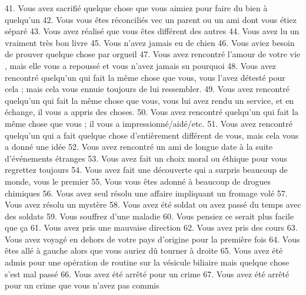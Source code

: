 \begin{tabular}
  41. Vous avez sacrifié quelque chose que vous aimiez pour faire du bien à quelqu'un
  42. Vous vous êtes réconciliés vec un parent ou un ami dont vous étiez séparé
  43. Vous avez réalisé que vous êtes différent des autres
  44. Vous avez lu un vraiment très bon livre
  45. Vous n'avez jamais eu de chien
  46. Vous aviez besoin de prouver quelque chose par orgueil
  47. Vous avez rencontré l'amour de votre vie , mais elle vous a repoussé et vous n'avez jamais su pourquoi
  48. Vous avez rencontré quelqu'un qui fait la même chose que vous, vous l'avez détesté pour cela ; mais cela vous ennuie toujours de lui ressembler.
  49. Vous avez rencontré quelqu'un qui fait la même chose que vous, vous lui avez rendu un service, et en échange, il vous a appris des choses.
  50. Vous avez rencontré quelqu'un qui fait la même chose que vous ; il vous a impressionné/aidé/etc.
  51. Vous avez rencontré quelqu'un qui a fait quelque chose d'entièrement différent de vous, mais cela vous a donné une idée
  52. Vous avez rencontré un ami de longue date à la suite d'événements étranges
  53. Vous avez fait un choix moral ou éthique pour vous regrettez toujours
  54. Vous avez fait une découverte qui a surpris beaucoup de monde, vous le premier
  55. Vous vous êtes adonné à beaucoup de drogues chimiques
  56. Vous avez seul résolu une affaire impliquant un fromage volé
  57. Vous avez résolu un mystère
  58. Vous avez été soldat ou avez passé du temps avec des soldats
  59. Vous souffrez d'une maladie
  60. Vous pensiez ce serait plus facile que ça
  61. Vous avez pris une mauvaise direction
  62. Vous avez pris des cours
  63. Vous avez voyagé en dehors de votre pays d'origine pour la première fois
  64. Vous êtes allé à gauche alors que vous auriez dû tourner à droite
  65. Vous avez été admis pour une opération de routine sur la vésicule biliaire mais quelque chose s'est mal passé
  66. Vous avez été arrêté pour un crime
  67. Vous avez été arrêté pour un crime que vous n'avez pas commis
  


\end{tabular}
